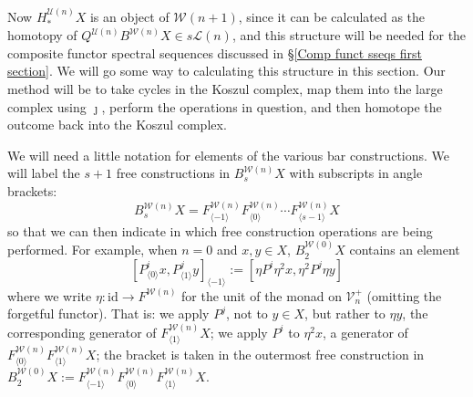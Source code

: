 \documentclass[11pt]{amsart} \renewcommand{\baselinestretch}{1.2}
\theoremstyle{plain}
\numberwithin{equation}{section} %
\theoremstyle{plain}
\numberwithin{equation}{chapter} %
\renewcommand{\to}{\longrightarrow}
\newcommand{\calU}{\mathcal{U}}
\newcommand{\calL}{\mathcal{L}}
\newcommand{\calV}{\mathcal{V}}
\newcommand{\calw}{\mathcal{W}}
\newcommand{\vect}[2]{\calV^{#1}_{#2}}
\newcommand{\Id}{\mathrm{id}}
\begin{document}
\begin{Koszul complexes}
Now $H^{\calU(n)}_*X$ is an object of $\calw(n+1)$, since it can be calculated as the homotopy of $Q^{\calU(n)}B^{\calw(n)}X\in s\calL(n)$, and this  structure will be needed for the composite functor spectral sequences discussed in \S\ref{Comp funct sseqs first section}. We will go some way to calculating this structure in this section. Our method will be to take cycles in the Koszul complex, map them into the large complex using $\jmath$, perform the operations in question, and then homotope the outcome back into the Koszul complex.

We will need a little notation for elements of the various bar constructions. We will label the $s+1$ free constructions in $B^{\calw(n)}_{s}X$ with subscripts in angle brackets: 
\[B^{\calw(n)}_{s}X= F^{\calw(n)}_{\langle -1\rangle}F^{\calw(n)}_{\langle 0\rangle}\cdots F^{\calw(n)}_{\langle s-1\rangle}X\]%
so that we can then indicate in which free construction operations are being performed. For example, when $n=0$ and $x,y\in X$, $B_2^{\calw(0)}X$ contains an element
\[[P^i_{\langle 0\rangle}x,P^j_{\langle 1\rangle}y]_{\langle -1\rangle}:=[\eta P^i\eta^2 x,\eta^2P^j\eta y]\]%
where we write $\eta:\Id\to F^{\calw(n)}$ for the unit of the monad on $\vect{+}{n}$ (omitting the forgetful functor). That is: we apply $P^j$, not to $y\in X$, but rather to $\eta y$, the corresponding generator of $F^{\calw(n)}_{\langle 1\rangle}X$; we  apply $P^i$ to $\eta^2 x$, a generator of $F^{\calw(n)}_{\langle 0\rangle}F^{\calw(n)}_{\langle 1\rangle}X$; the bracket is taken in the outermost free construction in $B_2^{\calw(0)}X:=F^{\calw(n)}_{\langle -1\rangle}F^{\calw(n)}_{\langle 0\rangle}F^{\calw(n)}_{\langle 1\rangle}X$.%


\end{Koszul complexes}
\end{document}
